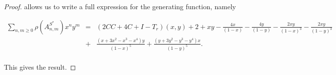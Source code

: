\documentclass[12pt]{article}
\theoremstyle{plain}
\theoremstyle{definition}
\theoremstyle{remark}
\theoremstyle{definition}
\begin{document}
\begin{proof}
allows us to write a full expression for the generating function, namely 

\begin{eqnarray*}
    \sum_{n,m \geq 0}\rho(A^{S^*}_{n,m})x^n y^m & = & (2CC + 4C + I - T_r)(x,y) + 2 +xy - \frac{4x}{(1-x)}- \frac{4y}{(1-y)} - \frac{2xy}{(1-x)^3} - \frac{2xy}{(1-y)^3} \\
    & + & \frac{(x+3x^2 -x^3 -x^4)y}{(1-x)^5} + \frac{(y+3y^2 -y^3 -y^4)x}{(1-y)^5}.\\
\end{eqnarray*}

This gives the result. 

\end{proof}
\end{document}
